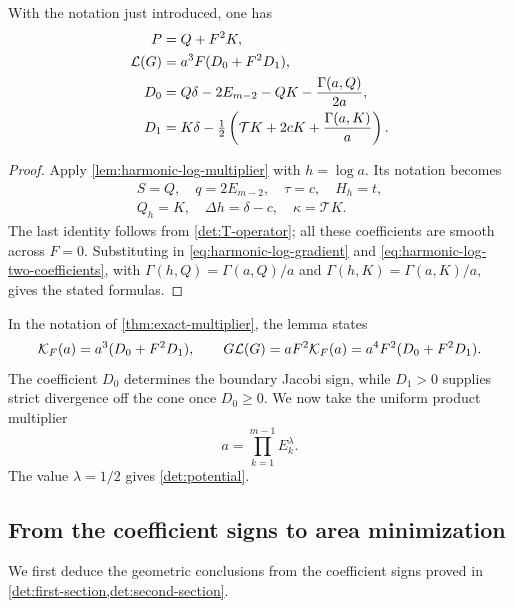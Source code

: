 \begin{lemma}\label{det:divergence-formula}
With the notation just introduced, one has
\begin{align}
 P&=Q+F^2K,\label{det:P}\\
 \mathcal L(G)&=a^3F(D_0+F^2D_1),
 \label{det:divergence}\\
 D_0&=Q\delta-2E_{m-2}-QK-\frac{\Gamma(a,Q)}{2a},
 \label{det:D0}\\
 D_1&=K\delta-\tfrac12\left(\mathcal TK+2cK+\frac{\Gamma(a,K)}a\right).
 \label{det:D1}
\end{align}
\end{lemma}

\begin{proof}
Apply \cref{lem:harmonic-log-multiplier} with \(h=\log a\).
Its notation becomes
\[
 \begin{gathered}
 S=Q,\quad q=2E_{m-2},\quad \tau=c,\quad H_h=t,\\
 Q_h=K,\quad \Delta h=\delta-c,\quad \kappa=\mathcal TK.
 \end{gathered}
\]
The last identity follows from \eqref{det:T-operator}; all these
coefficients are smooth across \(F=0\).
Substituting in \eqref{eq:harmonic-log-gradient} and
\eqref{eq:harmonic-log-two-coefficients}, with
\(\Gamma(h,Q)=\Gamma(a,Q)/a\) and
\(\Gamma(h,K)=\Gamma(a,K)/a\), gives the stated formulas.
\end{proof}

In the notation of \cref{thm:exact-multiplier}, the lemma states
\[
 \mathcal K_F(a)=a^3(D_0+F^2D_1),\qquad
 G\mathcal L(G)=aF^2\mathcal K_F(a)=a^4F^2(D_0+F^2D_1).
\]
The coefficient $D_0$ determines the boundary Jacobi sign, while
$D_1>0$ supplies strict divergence off the cone once $D_0\geq0$.
We now take the uniform product multiplier
\begin{equation}\label{det:uniform-weight}
 a=\prod_{k=1}^{m-1}E_k^\lambda.
\end{equation}
The value $\lambda=1/2$ gives \eqref{det:potential}.

\subsection{From the coefficient signs to area minimization}
\label{det:geometric-proof}

We first deduce the geometric conclusions from the coefficient signs
proved in \cref{det:first-section,det:second-section}.

